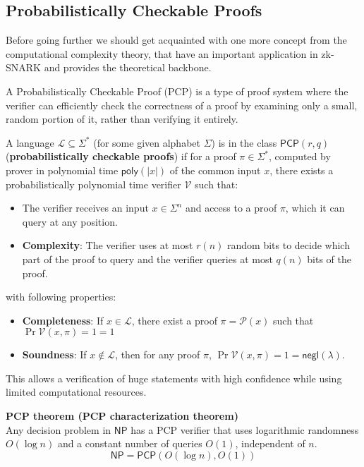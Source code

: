 \documentclass[../lecture-notes.tex]{subfiles}
\begin{document}
\subsection{Probabilistically Checkable Proofs}

Before going further we should get acquainted with one more concept from the computational 
complexity theory, that have an important application in zk-SNARK and provides the theoretical 
backbone. 

A Probabilistically Checkable Proof (PCP) is a type of proof system where the verifier can 
efficiently check the correctness of a proof by examining only a small, random portion of it, rather
than verifying it entirely. 
\begin{definition}
    A language $\mathcal{L} \subseteq \Sigma^*$ (for some given alphabet $\Sigma$) is in the class $\mathsf{PCP}(r,q)$ (\textbf{probabilistically checkable proofs}) if for a proof 
    $\pi \in \Sigma^*$, computed by prover in polynomial time $\mathsf{poly}(|x|)$ of the common input $x$, there exists a probabilistically polynomial time verifier $\mathcal{V}$ such
    that:
    \begin{itemize}
        \item The verifier receives an input $x \in \Sigma^n$ and access to a proof $\pi$, which it
            can query at any position.
        \item \textbf{Complexity}: The verifier uses at most $r(n)$ random bits to decide which part of the proof to 
            query and the verifier queries at most $q(n)$ bits of the proof.
    \end{itemize}
    with following properties:
    \begin{itemize}
        \item \textbf{Completeness}: If $x \in \mathcal{L}$, there exist a proof 
            $\pi = \mathcal{P}(x)$ such that $\Pr{\mathcal{V}(x, \pi) = 1} = 1$
        \item \textbf{Soundness}: If $x \notin \mathcal{L}$, then for any proof 
            $\pi$, $\Pr{\mathcal{V}(x, \pi) = 1} = \mathsf{negl}(\lambda)$.
    \end{itemize}
\end{definition}
This allows a verification of huge statements with high confidence while using limited computational
resources.

\begin{theorem}{\textbf{PCP theorem (PCP characterization theorem)}\\}
    Any decision problem in $\mathsf{NP}$ has a PCP verifier that uses logarithmic randomness 
    $O(\log n)$ and a constant number of queries $O(1)$, independent of $n$.
    \begin{equation*}
        \mathsf{NP} = \mathsf{PCP}(O(\log n), O(1))
    \end{equation*}
\end{theorem}
\end{document}
